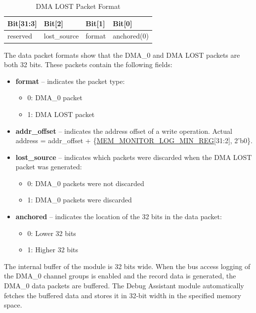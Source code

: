 \documentclass[main\_\_EN.tex]{subfiles}
\begin{document}
\begin{table}[h]
\centering
\caption{DMA LOST Packet Format}
\label{tab:dbgassist-dma-lost-package}
\begin{tabular}{|L{2cm}|L{2cm}|L{2cm}|L{2cm}|}
\hline
{}
\textbf{Bit[31:3]} & \textbf{Bit[2]} & \textbf{Bit[1]} & \textbf{Bit[0]} \\
\hline
reserved & lost\_source & format & anchored(0) \\
\hline
\end{tabular}
\end{table}

The data packet formats show that the DMA\_0 and DMA LOST packets are both 32 bits. These packets contain the following fields:

\begin{itemize}
    \item \textbf{format} – indicates the packet type:
    \begin{itemize}
        \item 0: DMA\_0 packet
        \item 1: DMA LOST packet
    \end{itemize}
    \item \textbf{addr\_offset} – indicates the address offset of a write operation. Actual address = addr\_offset + \{\hyperref[regdesc:MEMMONITORLOGMINREG]{MEM\_MONITOR\_LOG\_MIN\_REG}[31:2], 2'b0\}.
    \item \textbf{lost\_source} – indicates which packets were discarded when the DMA LOST packet was generated:
    \begin{itemize}
        \item 0: DMA\_0 packets were not discarded
        \item 1: DMA\_0 packets were discarded
    \end{itemize}
    \item \textbf{anchored} – indicates the location of the 32 bits in the data packet:
    \begin{itemize}
        \item 0: Lower 32 bits
        \item 1: Higher 32 bits
    \end{itemize}
\end{itemize}

The internal buffer of the module is 32 bits wide. When the bus access logging of the DMA\_0 channel groups is enabled and the record data is generated, the DMA\_0 data packets are buffered. The Debug Assistant module automatically fetches the buffered data and stores it in 32-bit width in the specified memory space.
\end{document}
